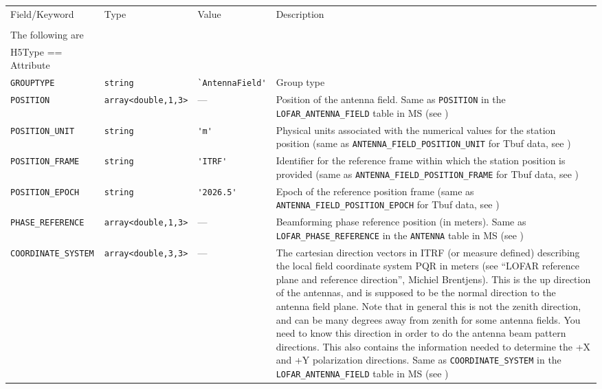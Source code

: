 \documentclass[a4paper,10pt,bibtotoc]{scrartcl}
\begin{document}
  \begin{supertabular}{|lllp{5.5cm}|}
    \hline
    \sc Field/Keyword  & \sc Type & \sc Value & Description \\
    \sc   & \sc & \sc & \\
    \hline \hline
    \sc The following are & \sc & \sc & \\
    \sc H5Type == Attribute & \sc & \sc & \\
    \hline
    \verb|GROUPTYPE|   & \verb|string|          & \verb|`AntennaField'| & Group type  \\
    \verb|POSITION|    & \verb|array<double,1,3>| & --- & Position of the antenna field. Same as \verb|POSITION| in the \verb|LOFAR_ANTENNA_FIELD| table in MS (see \cite{ms2.lofar.2018}) \\
    \verb|POSITION_UNIT| & \verb|string| & \verb|'m'| & Physical units associated with the numerical values for the station position (same as \verb|ANTENNA_FIELD_POSITION_UNIT| for Tbuf data, see \cite{lofar.ddd.001}) \\
    \verb|POSITION_FRAME| & \verb|string| & \verb|'ITRF'| & Identifier for the reference frame within which the station position is provided (same as \verb|ANTENNA_FIELD_POSITION_FRAME| for Tbuf data, see \cite{lofar.ddd.001}) \\
    \verb|POSITION_EPOCH| & \verb|string| & \verb|'2026.5'| & Epoch of the reference position frame (same as \verb|ANTENNA_FIELD_POSITION_EPOCH| for Tbuf data, see \cite{lofar.ddd.001}) \\
    \verb|PHASE_REFERENCE| & \verb|array<double,1,3>| & --- & Beamforming phase reference position (in meters). Same as \verb|LOFAR_PHASE_REFERENCE| in the \verb|ANTENNA| table in MS (see \cite{ms2.lofar.2018}) \\
    \verb|COORDINATE_SYSTEM| & \verb|array<double,3,3>| & --- & The cartesian direction vectors in ITRF (or measure defined) describing the local field coordinate system PQR in meters (see ``LOFAR reference plane and reference direction'', Michiel Brentjens). This is the up direction of the antennas, and is supposed to be the normal direction to the antenna field plane. Note that in general this is not the zenith direction, and can be many degrees away from zenith for some antenna fields. You need to know this direction in order to do the antenna beam pattern directions. This also contains the information needed to determine the +X and +Y polarization directions. Same as \verb|COORDINATE_SYSTEM| in the \verb|LOFAR_ANTENNA_FIELD| table in MS (see \cite{ms2.lofar.2018}) \\

\end{supertabular}
\end{document}
